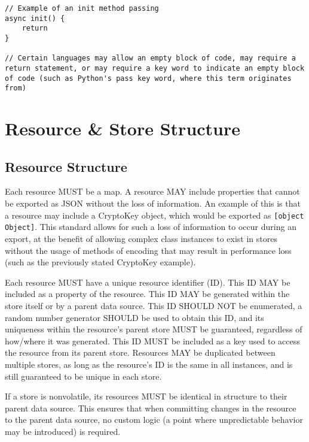 \documentclass{article}
\begin{document}
\begin{lstlisting}[caption=Passing]
// Example of an init method passing
async init() {
    return
}

// Certain languages may allow an empty block of code, may require a return statement, or may require a key word to indicate an empty block of code (such as Python's pass key word, where this term originates from)
\end{lstlisting}

\section{Resource \& Store Structure}

\subsection{Resource Structure}
Each resource MUST be a map. A resource MAY include properties that cannot be exported as JSON without the loss of information. An example of this is that a resource may include a CryptoKey object, which would be exported as \verb|[object Object]|. This standard allows for such a loss of information to occur during an export, at the benefit of allowing complex class instances to exist in stores without the usage of methods of encoding that may result in performance loss (such as the previously stated CryptoKey example).

Each resource MUST have a unique resource identifier (ID). This ID MAY be included as a property of the resource. This ID MAY be generated within the store itself or by a parent data source. This ID SHOULD NOT be enumerated, a random number generator SHOULD be used to obtain this ID, and its uniqueness within the resource's parent store MUST be guaranteed, regardless of how/where it was generated. This ID MUST be included as a key used to access the resource from its parent store. Resources MAY be duplicated between multiple stores, as long as the resource's ID is the same in all instances, and is still guaranteed to be unique in each store.

If a store is nonvolatile, its resources MUST be identical in structure to their parent data source. This ensures that when committing changes in the resource to the parent data source, no custom logic (a point where unpredictable behavior may be introduced) is required.
\end{document}
